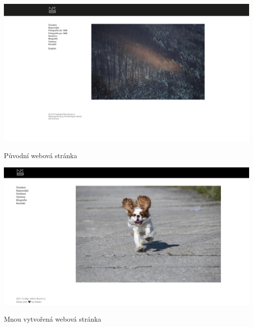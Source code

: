 \documentclass[12pt,a4paper]{report}
\begin{document}
  \vspace*{0.5cm}
  \noindent\includegraphics[width=\linewidth]{milanburescz.png}
  \begin{center}
    Původní webová stránka
  \end{center}
  \vspace*{0.5cm}
  \noindent\includegraphics[width=\linewidth]{dmp-bures.png}
  \begin{center}
    Mnou vytvořená webová stránka
  \end{center}
  \vspace*{0.5cm}
\end{document}
